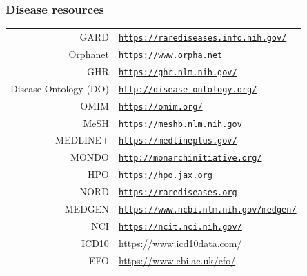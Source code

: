 ﻿\documentclass[anchorcolor=blue,linkcolor=blue]{beamer}
\begin{document}
\begin{frame}
  \frametitle{Disease resources}
  \begin{center}
    \begin{tabular}{rl}
      GARD &
      \href{https://rarediseases.info.nih.gov/}{\texttt{https://rarediseases.info.nih.gov/}}\\
      Orphanet &
      \href{https://www.orpha.net}{\texttt{https://www.orpha.net}}\\
      GHR&
      \href{https://ghr.nlm.nih.gov/}{\texttt{https://ghr.nlm.nih.gov/}}\\
      Disease Ontology (DO) &
      \href{http://disease-ontology.org/}{\texttt{http://disease-ontology.org/}}\\
      OMIM & \href{https://omim.org/}{\texttt{https://omim.org/}}\\
      MeSH &
      \href{https://meshb.nlm.nih.gov}{\texttt{https://meshb.nlm.nih.gov}}\\
      MEDLINE+ &
      \href{https://medlineplus.gov/}{\texttt{https://medlineplus.gov/}}\\
      MONDO &
      \href{http://monarchinitiative.org/}{\texttt{http://monarchinitiative.org/}}\\
      HPO & \href{https://hpo.jax.org}{\texttt{https://hpo.jax.org}}\\
      NORD & \href{https://rarediseases.org}{\texttt{https://rarediseases.org}}\\
      MEDGEN & \href{https://www.ncbi.nlm.nih.gov/medgen/}{\texttt{https://www.ncbi.nlm.nih.gov/medgen/}}\\
      NCI & \href{https://ncit.nci.nih.gov/}{\texttt{https://ncit.nci.nih.gov/}}\\
      ICD10 & \href{https://www.icd10data.com/}{https://www.icd10data.com/}\\
      EFO & \href{https://www.ebi.ac.uk/efo/}{https://www.ebi.ac.uk/efo/}
    \end{tabular}
  \end{center}
\end{frame}
\end{document}
